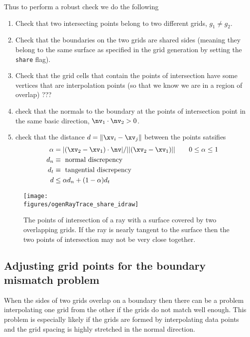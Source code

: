 Thus to perform a robust check we do the following
\begin{enumerate}
  \item Check that two intersecting points belong to two different grids, $g_1 \ne g_2$.
  \item Check that the boundaries on the two grids are shared sides (meaning they 
     belong to the same surface as specified in the grid generation by setting the
     {\tt share} flag).
  \item Check that the grid cells that contain the points of intersection 
     have some vertices that are interpolation points (so that we know we are in a region of overlap) ???
  \item check that the normals to the boundary at the points of intersection 
        point in the same basic direction, $\nv_1\cdot \nv_2 > 0$.
  \item check that the distance $d=\| \xv_i - \xv_j \|$ between the points satsifies
      \begin{align*}
           \alpha &= \vert(\xv_2-\xv_1)\cdot \nv \vert/ \vert\vert (\xv_2-\xv_1) \vert\vert  \qquad 0\le \alpha \le 1\\
           d_n &\equiv \mbox{ normal discrepency} \\
           d_t &\equiv \mbox{ tangential discrepency} \\
           d &\le \alpha d_n + (1-\alpha) d_t  
      \end{align*}
\end{enumerate}

\begin{figure}[hbt]
  \begin{center}
   \texttt{[image: \\figures/ogenRayTrace\_share\_idraw]}
  \caption{The points of intersection of a ray with a surface covered by two overlapping grids.
      If the ray is nearly tangent to the surface then the two points of intersection may not
      be very close together.}
  \end{center}
\end{figure}

\clearpage
\subsection{Adjusting grid points for the boundary mismatch problem}

When the sides of two grids overlap on a boundary then there can be a problem interpolating
one grid from the other if the grids do not match well enough. This problem is especially 
likely if the grids are formed by interpolating data points and the grid spacing is highly 
stretched in the normal direction.

